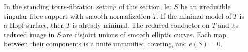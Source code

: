 
\begin{proposition}[P4.24]\hypertarget{tag-02WW}{}\label{night:P4.24}\label{stmt:P4.24}


In the standing torus-fibration setting of this section, let $S$ be an irreducible
singular fibre support with smooth normalization $T$.
If the minimal model of $T$ is a Hopf surface, then
$T$ is already minimal. The reduced conductor on $T$
and its reduced image in $S$ are disjoint unions of
smooth elliptic curves. Each map between their
components is a finite unramified covering, and
$e(S)=0$.
\end{proposition}

